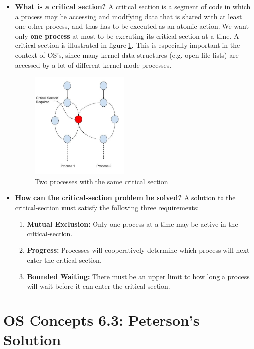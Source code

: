 \documentclass[12pt]{article}
\begin{document}
\begin{itemize}
    \item \textbf{What is a critical section?} A critical section is a segment of code in which a process may be accessing and modifying data that is shared with at least one other process, and thus has to be executed as an atomic action. We want only \textbf{one process} at most to be executing its critical section at a time. A critical section is illustrated in figure \ref{fig:critical-section}. This is especially important in the context of OS's, since many kernel data structures (e.g. open file lists) are accessed by a lot of different kernel-mode processes.
    \begin{figure}[ht]
        \centering
        \includegraphics[width=0.45\textwidth]{figures/critical-section.jpg}
        \caption{Two processes with the same critical section}
        \label{fig:critical-section}
    \end{figure}
    \item \textbf{How can the critical-section problem be solved?} A solution to the critical-section must satisfy the following three requirements:
    \begin{enumerate}
        \item \textbf{Mutual Exclusion:} Only one process at a time may be active in the critical-section.
        \item \textbf{Progress:} Processes will cooperatively determine which process will next enter the critical-section.
        \item \textbf{Bounded Waiting:} There must be an upper limit to how long a process will wait before it can enter the critical section.
    \end{enumerate}
\end{itemize}

\section*{OS Concepts 6.3: Peterson's Solution}
\end{document}
